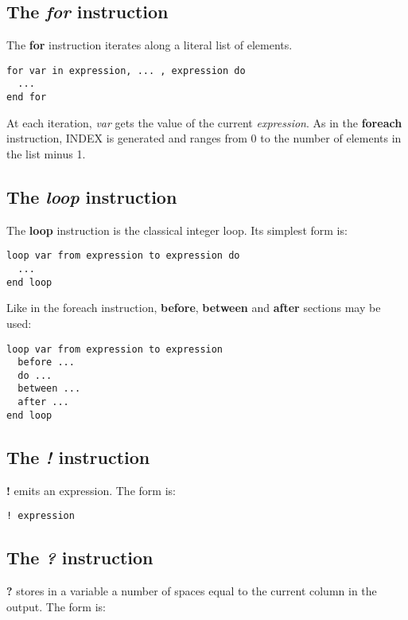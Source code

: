 \subsection{The {\em for} instruction}

The {\bf for} instruction iterates along a literal list of elements.

\begin{lstlisting}[frame=single]
for var in expression, ... , expression do
  ...
end for
\end{lstlisting}

At each iteration, {\em var} gets the value of the current {\em expression}. As in the {\bf foreach} instruction, INDEX is generated and ranges from 0 to the number of elements in the list minus 1.

\subsection{The {\em loop} instruction}

The {\bf loop} instruction is the classical integer loop. Its simplest form is:

\begin{lstlisting}[frame=single]
loop var from expression to expression do
  ...
end loop
\end{lstlisting}

Like in the foreach instruction, {\bf before},  {\bf between} and  {\bf after} sections may be used:

\begin{lstlisting}[frame=single]
loop var from expression to expression
  before ...
  do ...
  between ...
  after ...
end loop
\end{lstlisting}


\subsection{The {\em !} instruction}
\label{outputInstruction}

{\bf !} emits an expression. The form is:

\begin{lstlisting}[frame=single]
! expression
\end{lstlisting}

\subsection{The {\em ?} instruction}

{\bf ?} stores in a variable a number of spaces equal to the current column in the output. The form is:

